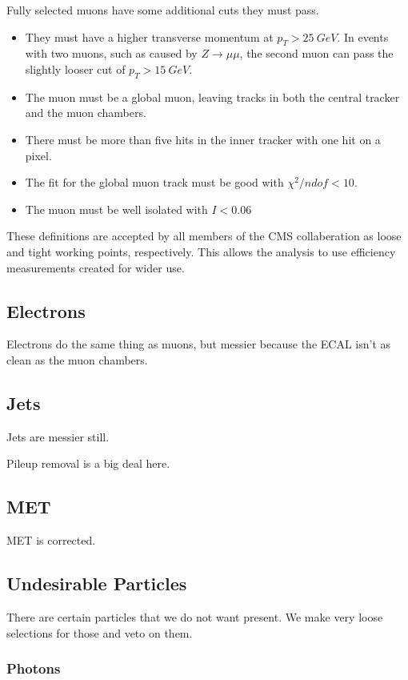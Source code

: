 Fully selected muons have some additional cuts they must pass.
\begin{itemize}
\item They must have a higher transverse momentum at $p_T > \SI{25}{GeV}$.
  In events with two muons, such as caused by $Z \rightarrow \mu\mu$,
  the second muon can pass the slightly looser cut of $p_T > \SI{15}{GeV}$.
\item The muon must be a global muon, leaving tracks in both the central tracker
  and the muon chambers.
\item There must be more than five hits in the inner tracker with one hit on a pixel.
\item The fit for the global muon track must be good with $\chi^2/ndof < 10$.
\item The muon must be well isolated with $I < 0.06$
\end{itemize}

These definitions are accepted by all members of the CMS collaberation
as loose and tight working points, respectively.
This allows the analysis to use efficiency measurements created for wider use.

\subsection{Electrons}

Electrons do the same thing as muons,
but messier because the ECAL isn't as clean as the muon chambers.

\subsection{Jets}

Jets are messier still.

Pileup removal is a big deal here.

\subsection{MET}

MET is corrected.

\subsection{Undesirable Particles}

There are certain particles that we do not want present.
We make very loose selections for those and veto on them.

\subsubsection{Photons}

